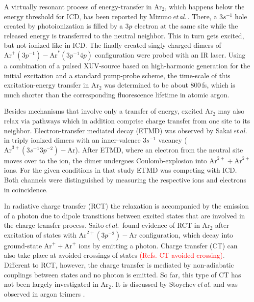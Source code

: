 \documentclass[%
 aip,
rsi,%
 amsmath,amssymb,
preprint,%
]{revtex4-1}
\begin{document}
A virtually resonant process of energy-transfer in Ar$_2$, which happens below the energy threshold for ICD, has been reported by Mizuno\textit{\,et\,al.}\,\cite{mizuno2017}. There, a $3s^{-1}$ hole created by photoionization is filled by a $3p$ electron at the same site while the released energy is transferred to the neutral neighbor. This in turn gets excited, but not ionized like in ICD. The finally created singly charged dimers of $\mathrm{Ar}^{+}(3p^{-1}) - \mathrm{Ar}^{*}(3p^{-1}4p)$ configuration were probed with an IR laser. Using a combination of a pulsed XUV-source based on high-harmonic generation \cite{agostini2004} for the initial excitation and a standard pump-probe scheme, the time-scale of this excitation-energy transfer in Ar$_2$ was determined to be about 800\,fs, which is much shorter than the corresponding fluorescence lifetime in atomic argon.

Besides mechanisms that involve only a transfer of energy, excited Ar$_2$ may also relax via pathways which in addition comprise charge transfer from one site to its neighbor. Electron-transfer mediated decay (ETMD) \cite{Zobeley2001} was observed by Sakai\textit{\,et\,al.} \cite{Sakai2011} in triply ionized dimers with an inner-valence $3s^{-1}$ vacancy  ($\mathrm{Ar}^{3+}(3s^{-1}3p^{-2})-\mathrm{Ar}$). After ETMD, where an electron from the neutral site moves over to the ion, the dimer undergoes Coulomb-explosion into $\mathrm{Ar}^{2+} + \mathrm{Ar}^ {2+}$ ions. For the given conditions in that study \cite{Sakai2011} ETMD was competing with ICD. Both channels were distinguished by measuring the respective ions and electrons in coincidence.

In radiative charge transfer (RCT) \cite{Biondi1978} the relaxation is accompanied by the emission of a photon due to dipole transitions between excited states that are involved in the charge-transfer process. Saito\textit{\,et\,al.}\,\cite{Saito2007} found evidence of RCT in Ar$_2$ after excitation of states with $\mathrm{Ar}^{2+}(3p^{-2})-\mathrm{Ar}$ configuration, which decay into ground-state $\mathrm{Ar}^{+} + \mathrm{Ar}^+$ ions by emitting a photon. Charge transfer (CT) can also take place at avoided crossings \cite{devaquet1975} of states \textcolor{red}{(Refs. CT avoided crossing)}. Different to RCT, however, the charge transfer is mediated by non-adiabatic couplings between states and no photon is emitted. So far, this type of CT has not been largely investigated in Ar$_2$. It is discussed by Stoychev\,\textit{et\,al.} \citep{Stoychev2008} and was observed in argon trimers \citep{liu2007}.
\end{document}

